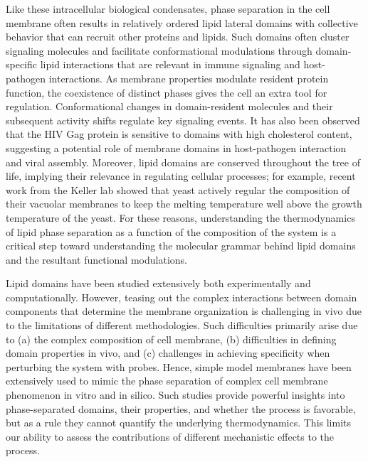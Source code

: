 \documentclass{biophys-new}
\begin{document}
Like these intracellular biological condensates, phase separation in the cell membrane often results in relatively ordered lipid lateral domains with collective behavior that can recruit other proteins and lipids\cite{Sezgin2017, Case2019}. 
Such domains often cluster signaling molecules\cite{Tian2007} and facilitate conformational modulations through domain-specific lipid interactions\cite{Laganowsky2014,Lingwood2011} that are relevant in immune signaling\cite{Beck-garcia2015,Wisser2017} and host-pathogen interactions\cite{Dick2012}.
As membrane properties modulate resident protein function, the coexistence of distinct phases gives the cell an extra tool for regulation.
Conformational changes in domain-resident molecules and their subsequent activity shifts regulate key signaling events\cite{Laganowsky2014,Lingwood2011}.
It has also been observed that the HIV Gag protein is sensitive to domains with high cholesterol content, suggesting a potential role of membrane domains in host-pathogen interaction and viral assembly\cite{Dick2012}.
Moreover, lipid domains are conserved throughout the tree of life, implying their relevance in regulating cellular processes\cite{Sezgin2017}; for example, recent work from the Keller lab showed that yeast actively regular the composition of their vacuolar membranes to keep the melting temperature well above the growth temperature of the yeast\cite{Keller2022}.
For these reasons, understanding the thermodynamics of lipid phase separation as a function of the composition of the system is a critical step toward understanding the molecular grammar behind lipid domains and the resultant functional modulations. 


Lipid domains have been studied extensively both experimentally and computationally.
However, teasing out the complex interactions between domain components that determine the membrane organization is challenging in vivo due to the limitations of different methodologies\cite{Klotzsch2013}.
Such difficulties primarily arise due to (a) the complex composition of cell membrane\cite{Tieleman2019}, (b) difficulties in defining domain properties in vivo\cite{Sezgin2017}, and (c) challenges in achieving specificity when perturbing the system with probes\cite{Veatch2007}.
Hence, simple model membranes have been extensively used to mimic the phase separation of complex cell membrane phenomenon in vitro\cite{Veatch2003a,Veatch2002,Veatch2003} and in silico\cite{Risselada2008,Lin2016,Lin2019}.
Such studies provide powerful insights into phase-separated domains, their properties, and whether the process is favorable, but as a rule they cannot quantify the underlying thermodynamics. This limits our ability to assess the contributions of different mechanistic effects to the process.
\end{document}
